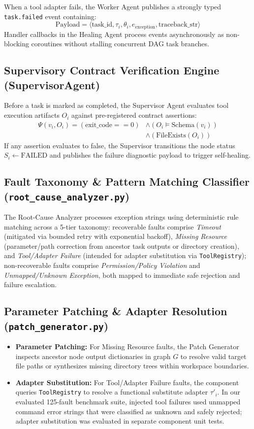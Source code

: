 \documentclass[conference]{IEEEtran}
\begin{document}
When a tool adapter fails, the Worker Agent publishes a strongly typed \texttt{task.failed} event containing:
\begin{equation}
\text{Payload} = \langle \text{task\_id}, \tau_i, \theta_i, e_{\text{exception}}, \text{traceback\_str} \rangle
\end{equation}
Handler callbacks in the Healing Agent process events asynchronously as non-blocking coroutines without stalling concurrent DAG task branches.

\subsection{Supervisory Contract Verification Engine (SupervisorAgent)}
Before a task is marked as completed, the Supervisor Agent evaluates tool execution artifacts $O_i$ against pre-registered contract assertions:
\begin{align}
\Psi(v_i, O_i) = (\text{exit\_code} == 0) &\land (O_i \models \text{Schema}(v_i)) \nonumber \\
&\land (\text{FileExists}(O_i))
\end{align}
If any assertion evaluates to false, the Supervisor transitions the node status $S_i \leftarrow \text{FAILED}$ and publishes the failure diagnostic payload to trigger self-healing.

\subsection{Fault Taxonomy \& Pattern Matching Classifier (\texttt{root\_cause\_analyzer.py})}
The Root-Cause Analyzer processes exception strings using deterministic rule matching across a 5-tier taxonomy: recoverable faults comprise \textit{Timeout} (mitigated via bounded retry with exponential backoff), \textit{Missing Resource} (parameter/path correction from ancestor task outputs or directory creation), and \textit{Tool/Adapter Failure} (intended for adapter substitution via \texttt{ToolRegistry}); non-recoverable faults comprise \textit{Permission/Policy Violation} and \textit{Unmapped/Unknown Exception}, both mapped to immediate safe rejection and failure escalation.

\subsection{Parameter Patching \& Adapter Resolution (\texttt{patch\_generator.py})}
\begin{itemize}
    \item \textbf{Parameter Patching:} For Missing Resource faults, the Patch Generator inspects ancestor node output dictionaries in graph $G$ to resolve valid target file paths or synthesizes missing directory trees within workspace boundaries.
    \item \textbf{Adapter Substitution:} For Tool/Adapter Failure faults, the component queries \texttt{ToolRegistry} to resolve a functional substitute adapter $\tau'_i$. In our evaluated 125-fault benchmark suite, injected tool failures used unmapped command error strings that were classified as unknown and safely rejected; adapter substitution was evaluated in separate component unit tests.
\end{itemize}
\end{document}
